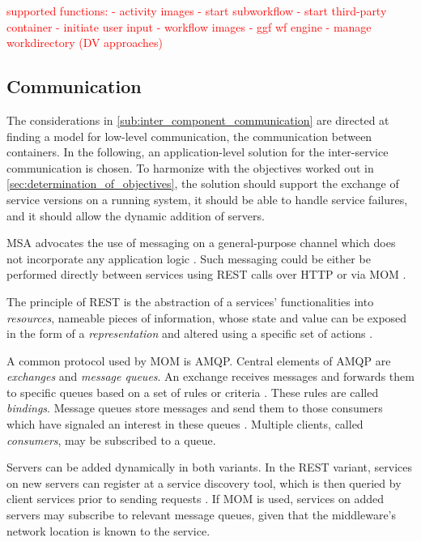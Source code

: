 \textcolor{red}{
  supported functions:
    - activity images
      - start subworkflow
      - start third-party container
      - initiate user input
    - workflow images
      - ggf wf engine
      - manage workdirectory (DV approaches)
}

\subsection{Communication} %
  \label{sub:application_level_communication}
  The considerations in \ref{sub:inter_component_communication} are directed at finding a model for low-level communication, \ie the communication between containers. In the following, an application-level solution for the inter-service communication is chosen. To harmonize with the objectives worked out in \ref{sec:determination_of_objectives}, the solution should  support the exchange of service versions on a running system, it should be able to handle service failures, and it should allow the dynamic addition of servers.

  \ac{MSA} advocates the use of messaging on a general-purpose channel which does not incorporate any application logic \cite[pp.~20]{Strimbei2015Software}. Such messaging could be either be performed directly between services using \ac{REST} calls over \ac{HTTP} or via \ac{MOM} \cite[pp.~23-24, p.~30]{Newman2015Building}.

  The principle of \ac{REST} is the abstraction of a services' functionalities into \emph{resources}, nameable pieces of information, whose state and value can be exposed in the form of a \emph{representation} and altered using a specific set of actions \cite[p.~3]{Fielding2002Principled}.

  A common protocol used by \ac{MOM} is \ac{AMQP}. Central elements of \ac{AMQP} are \emph{exchanges} and \emph{message queues}. An exchange receives messages and forwards them to specific queues based on a set of rules or criteria \cite[p.~88]{Vinoski2006Advanced}. These rules are called \emph{bindings}.
  Message queues store messages and send them to those consumers which have signaled an interest in these queues \cite[p.~88]{Vinoski2006Advanced}. Multiple clients, called \emph{consumers}, may be subscribed to a queue.

  Servers can be added dynamically in both variants. In the \ac{REST} variant, services on new servers can register at a service discovery tool, which is then queried by client services prior to sending requests \cite{Richardson2015Service}. If \ac{MOM} is used, services on added servers may subscribe to relevant message queues, given that the middleware's network location is known to the service.

